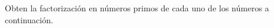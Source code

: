 \question[20] Obten la factorización en n\'umeros primos de cada uno de los n\'umeros a continuaci\'on.
\begin{multicols}{2}

\begin{parts}
    {\printanswers
    
    }
    
    
    
    
    
    
    
    
    
\end{parts}
\end{multicols}